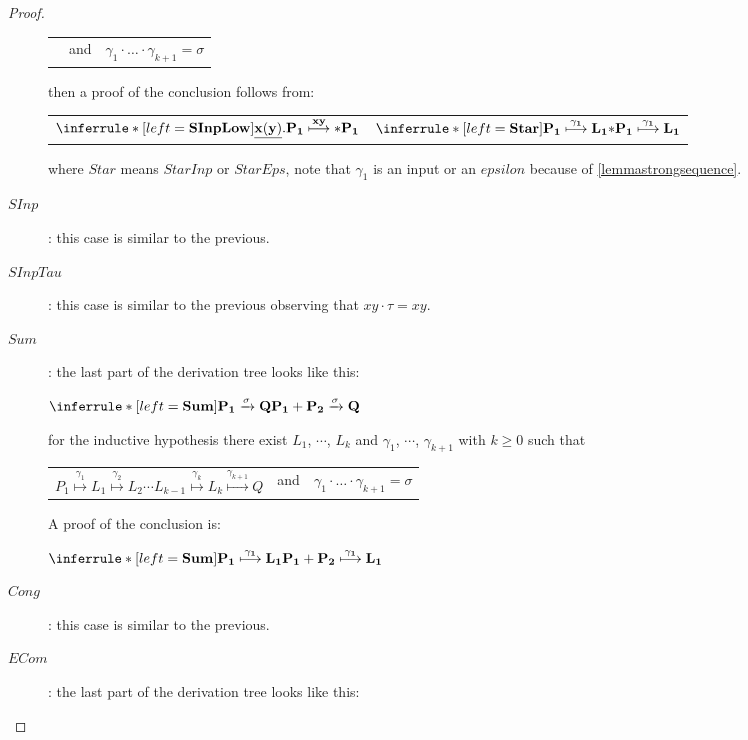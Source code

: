 \begin{proposition}
\begin{proof}
\begin{description}
\begin{center}
\begin{tabular}{lll}
	      &
		and
	      &
		$\gamma_{1} \cdot \ldots \cdot \gamma_{k+1} = \sigma$
	      \end{tabular}
	    \end{center}
	    then a proof of the conclusion follows from:
	    \begin{center}
	      \begin{tabular}{ll}
		$\inferrule* [left=\bf{SInpLow}]{
 		}{
 		  \underline{x(y)}.P_{1} \stackrel{xy}{\longmapsto} *P_{1}
 		}$
	      &
		$\inferrule* [left=\bf{Star}]{
 		  P_{1} \stackrel{\gamma_{1}}{\longmapsto} L_{1}
 		}{
 		  *P_{1} \stackrel{\gamma_{1}}{\longmapsto} L_{1}
 		}$
	      \end{tabular}
	    \end{center}
	    where $Star$ means $StarInp$ or $StarEps$, note that $\gamma_{1}$ is an input or an $epsilon$ because of \ref{lemmastrongsequence}.
	  \item[$SInp$]: this case is similar to the previous.
	  \item[$SInpTau$]: this case is similar to the previous observing that $xy \cdot \tau = xy$.
	  \item[$Sum$]: 
	the last part of the derivation tree looks like this:
	\begin{center}
	  $\inferrule* [left=\bf{Sum}]{
	    P_{1} \xrightarrow{\sigma} Q
	  }{
	    P_{1}+P_{2} \xrightarrow{\sigma} Q
	  }$
	\end{center}
	for the inductive hypothesis there exist $L_{1}$, $\cdots$, $L_{k}$ and $\gamma_{1}$, $\cdots$, $\gamma_{k+1}$ with $k\geq 0$ such that 
	\begin{center}
	  \begin{tabular}{lll}
	    $P_{1} \stackrel{\gamma_{1}}{\longmapsto} L_{1}  \stackrel{\gamma_{2}}{\longmapsto} L_{2} \cdots L_{k-1} \stackrel{\gamma_{k}}{\longmapsto} L_{k} \stackrel{\gamma_{k+1}}{\longmapsto} Q$ 
	  &
	    and
	  &
	    $\gamma_{1} \cdot \ldots \cdot \gamma_{k+1} = \sigma$  
	  \end{tabular}
	\end{center}
	A proof of the conclusion is:
	\begin{center}
	  $\inferrule* [left=\bf{Sum}]{
	      P_{1} \stackrel{\gamma_{1}}{\longmapsto} L_{1}
	    }{
	      P_{1}+P_{2} \stackrel{\gamma_{1}}{\longmapsto} L_{1}
	    }
	  $
	\end{center}
      \item[$Cong$]: this case is similar to the previous.
      \item[$ECom$]: 
	the last part of the derivation tree looks like this:

\end{description}
\end{proof}
\end{proposition}
